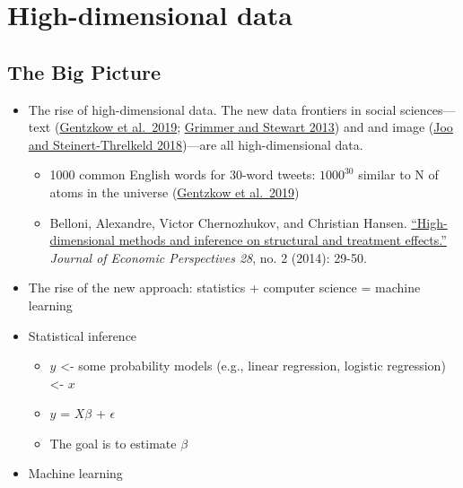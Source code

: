 \documentclass[
]{book}
\begin{document}
\hypertarget{machine_learning}{%
\chapter{High-dimensional data}\label{machine_learning}}

\hypertarget{the-big-picture-9}{%
\section{The Big Picture}\label{the-big-picture-9}}

\begin{itemize}
\item
  The rise of high-dimensional data. The new data frontiers in social sciences---text (\href{https://web.stanford.edu/~gentzkow/research/text-as-data.pdf}{Gentzkow et al.~2019}; \href{https://www.jstor.org/stable/pdf/24572662.pdf?casa_token=SQdSI4R_VdwAAAAA:4QiVLhCXqr9f0qNMM9U75EL5JbDxxnXxUxyIfDf0U8ZzQx9szc0xVqaU6DXG4nHyZiNkvcwGlgD6H0Lxj3y0ULHwgkf1MZt8-9TPVtkEH9I4AHgbTg}{Grimmer and Stewart 2013}) and and image (\href{https://arxiv.org/pdf/1810.01544}{Joo and Steinert-Threlkeld 2018})---are all high-dimensional data.

  \begin{itemize}
  \item
    1000 common English words for 30-word tweets: \(1000^{30}\) similar to N of atoms in the universe (\href{https://web.stanford.edu/~gentzkow/research/text-as-data.pdf}{Gentzkow et al.~2019})
  \item
    Belloni, Alexandre, Victor Chernozhukov, and Christian Hansen. \href{https://pubs.aeaweb.org/doi/pdfplus/10.1257/jep.28.2.29}{``High-dimensional methods and inference on structural and treatment effects.''} \emph{Journal of Economic Perspectives 28}, no. 2 (2014): 29-50.
  \end{itemize}
\item
  The rise of the new approach: statistics + computer science = machine learning
\item
  Statistical inference

  \begin{itemize}
  \item
    \(y\) \textless- some probability models (e.g., linear regression, logistic regression) \textless- \(x\)
  \item
    \(y\) = \(X\beta\) + \(\epsilon\)
  \item
    The goal is to estimate \(\beta\)
  \end{itemize}
\item
  Machine learning


\end{itemize}
\end{document}
